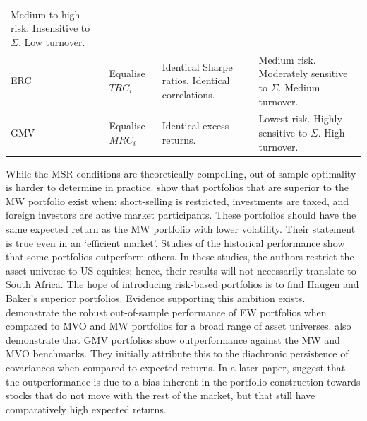 \documentclass[
]{article}
\begin{document}
\begin{longtable}[]{@{}llll@{}}
\begin{minipage}[t]{0.34\columnwidth}
Medium to high risk. Insensitive to \(\Sigma\). Low turnover.\strut
\end{minipage}\tabularnewline
\begin{minipage}[t]{0.06\columnwidth}\raggedright
ERC\strut
\end{minipage} & \begin{minipage}[t]{0.09\columnwidth}\raggedright
Equalise \(TRC_i\)\strut
\end{minipage} & \begin{minipage}[t]{0.39\columnwidth}\raggedright
Identical Sharpe ratios. Identical correlations.\strut
\end{minipage} & \begin{minipage}[t]{0.34\columnwidth}\raggedright
Medium risk. Moderately sensitive to \(\Sigma\). Medium turnover.\strut
\end{minipage}\tabularnewline
\begin{minipage}[t]{0.06\columnwidth}\raggedright
GMV\strut
\end{minipage} & \begin{minipage}[t]{0.09\columnwidth}\raggedright
Equalise \(MRC_i\)\strut
\end{minipage} & \begin{minipage}[t]{0.39\columnwidth}\raggedright
Identical excess returns.\strut
\end{minipage} & \begin{minipage}[t]{0.34\columnwidth}\raggedright
Lowest risk. Highly sensitive to \(\Sigma\). High turnover.\strut
\end{minipage}\tabularnewline
\bottomrule
\end{longtable}

While the MSR conditions are theoretically compelling, out-of-sample optimality is harder to determine
in practice. \citet{H91} show that portfolios that are superior to the MW portfolio exist when:
short-selling is restricted, investments are taxed, and foreign investors are active market
participants. These portfolios should have the same expected return as the MW portfolio with lower
volatility. Their statement is true even in an `efficient market'. Studies of the historical
performance show that some portfolios outperform others. In these studies, the authors restrict the
asset universe to US equities; hence, their results will not necessarily translate to South Africa.
The hope of introducing risk-based portfolios is to find Haugen and Baker's superior portfolios.
Evidence supporting this ambition exists. \citet{DGL07} demonstrate the robust out-of-sample
performance of EW portfolios when compared to MVO and MW portfolios for a broad range of asset
universes. \citet{C06} also demonstrate that GMV portfolios show outperformance against the MW and MVO
benchmarks. They initially attribute this to the diachronic persistence of covariances when compared
to expected returns. In a later paper, \citet{C11} suggest that the outperformance is due to a bias
inherent in the portfolio construction towards stocks that do not move with the rest of the market,
but that still have comparatively high expected returns.
\end{document}
